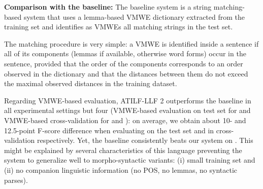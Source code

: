 \documentclass[output=paper,modfonts]{langscibook}
\begin{document}
\textbf{Comparison with the baseline:}
The baseline system is a string matching-based system that uses a lemma-based VMWE dictionary extracted from the training set and identifies as VMWEs all matching strings in the test set. 

The matching procedure is very simple: a VMWE is identified inside a sentence if all of its components (lemmas if available, otherwise word forms) occur in the sentence, provided that the order of the components corresponds to an order observed in the dictionary and that the distances between them do not exceed the maximal observed distances in the training dataset.

Regarding VMWE-based evaluation, ATILF-LLF 2 outperforms the baseline in all experimental settings but four (VMWE-based  evaluation on test set for  and VMWE-based cross-validation for  and ): on average, we obtain about 10- and 12.5-point F-score difference when evaluating on the test set and in cross-validation respectively. Yet, the baseline consistently beats our system on . This might be explained by several characteristics of this language preventing the system to generalize well to morpho-syntactic variants: (i) small training set and (ii) no companion linguistic information (no POS, no lemmas, no syntactic parses).
\end{document}
